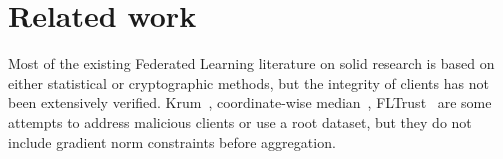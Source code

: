 \documentclass[10pt,twocolumn,letterpaper]{article}
\begin{document}
\section{Related work}
\label{sec:related}



 Most of the existing Federated Learning literature on solid research is based on either statistical or cryptographic methods, but the integrity of clients has not been extensively verified. Krum~\cite{blanchard2017machine}, coordinate-wise median~\cite{yin2018byzantine}, FLTrust~\cite{cao2021fltrust} are some attempts to address malicious clients or use a root dataset, but they do not include gradient norm constraints before aggregation.
 
\end{document}
